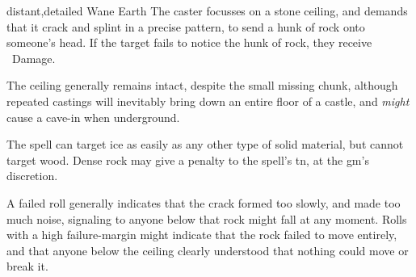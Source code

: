   {distant,detailed}%
  {Wane}%
  {Earth}%
  {}%
  {The caster focusses on a stone ceiling, and demands that it crack and splint in a precise pattern, to send a hunk of rock onto someone's head.
    If the target fails to notice the hunk of rock, they receive \showDam\ Damage.
  }%
  {
    The ceiling generally remains intact, despite the small missing chunk, although repeated castings will inevitably bring down an entire floor of a castle, and \emph{might} cause a cave-in when underground.

    The spell can target ice as easily as any other type of solid material, but cannot target wood.
    Dense rock may give a penalty to the spell's \gls{tn}, at the \gls{gm}'s discretion.

    A failed roll generally indicates that the crack formed too slowly, and made too much noise, signaling to anyone below that rock might fall at any moment.
    Rolls with a high failure-margin might indicate that the rock failed to move entirely, and that anyone below the ceiling clearly understood that nothing could move or break it.
  }


